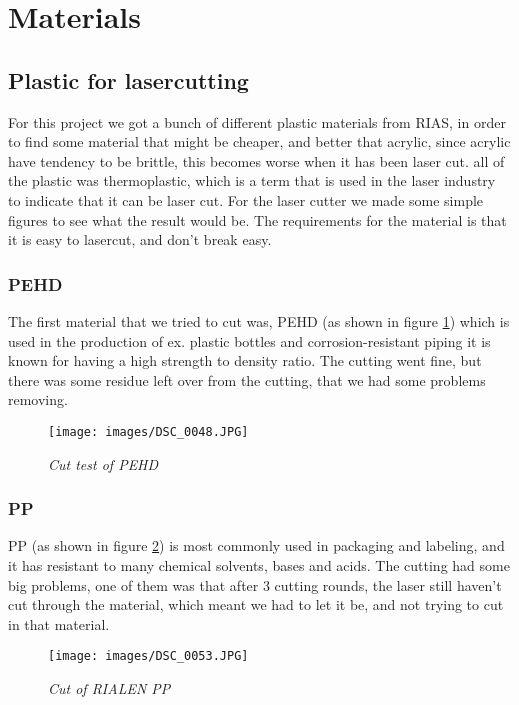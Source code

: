 \section{Materials}
\subsection{Plastic for lasercutting}
For this project we got a bunch of different plastic materials from RIAS, in order to find some material that might be cheaper, and better that acrylic, since acrylic have tendency to be brittle, this becomes worse when it has been laser cut.
all of the plastic was thermoplastic, which is a term that is used in the laser industry to indicate that it can be laser cut.
For the laser cutter we made some simple figures to see what the result would be.
The requirements for the material is that it is easy to lasercut, and don't break easy.
\subsubsection{PEHD}
The first material that we tried to cut was, PEHD (as shown in figure \ref{fig:PEHD}) which is used in the production of ex. plastic bottles and corrosion-resistant piping it is known for having a high strength to density ratio.
The cutting went fine, but there was some residue left over from the cutting, that we had some problems removing.
\begin{figure}[!h]
	\centering
	\texttt{[image: images/DSC\_0048.JPG]}
	\caption{\small {\it {Cut test of PEHD}}} \label{fig:PEHD}
\end{figure}
\FloatBarrier
\subsubsection{ PP}
 PP (as shown in figure \ref{fig:PP}) is most commonly used in packaging and labeling, and it has resistant to many chemical solvents, bases and acids.
The cutting had some big problems, one of them was that after 3 cutting rounds, the laser still haven't cut through the material, which meant we had to let it be, and not trying to cut in that material.
\begin{figure}[!h]
	\centering
	\texttt{[image: images/DSC\_0053.JPG]}
	\caption{\small {\it {Cut of RIALEN PP}}} \label{fig:PP}
\end{figure}
\FloatBarrier

